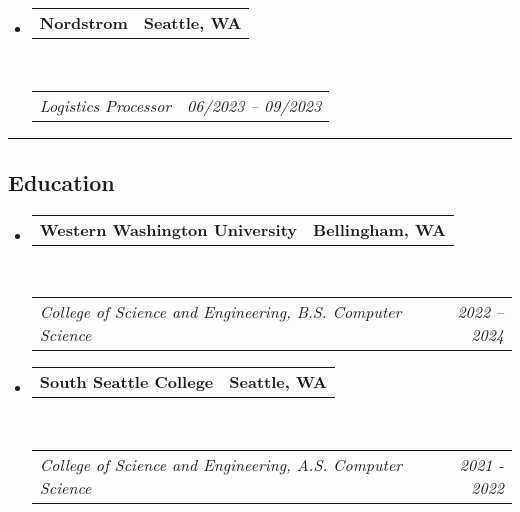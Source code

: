 \documentclass[10pt,letterpaper]{article}
\makeatletter
\newcommand{\headerrow}[2]
{\begin{tabular*}{\linewidth}{l@{\extracolsep{\fill}}r}
	#1 &
	#2 \\
\end{tabular*}}
\makeatother
\begin{document}
\begin{itemize}
    \item
          \headerrow
          {\textbf{Nordstrom}}
          {\textbf{Seattle, WA}}
          \\
          \headerrow
          {\emph{Logistics Processor}}
          {\emph{06/2023 -- 09/2023}}
\end{itemize}


\hrule
\vspace{-0.4em}
\subsection*{Education}

\begin{itemize}
    \parskip=0.1em

    \item
          \headerrow
          {\textbf{Western Washington University}}
          {\textbf{Bellingham, WA}}
          \\
          \headerrow
          {\emph{College of Science and Engineering, B.S. Computer Science}}
          {\emph{2022 -- 2024}}
    \item
          \headerrow
          {\textbf{South Seattle College}}
          {\textbf{Seattle, WA}}
          \\
          \headerrow
          {\emph{College of Science and Engineering, A.S. Computer Science}}
          {\emph{2021 - 2022}}
\end{itemize}
\end{document}
